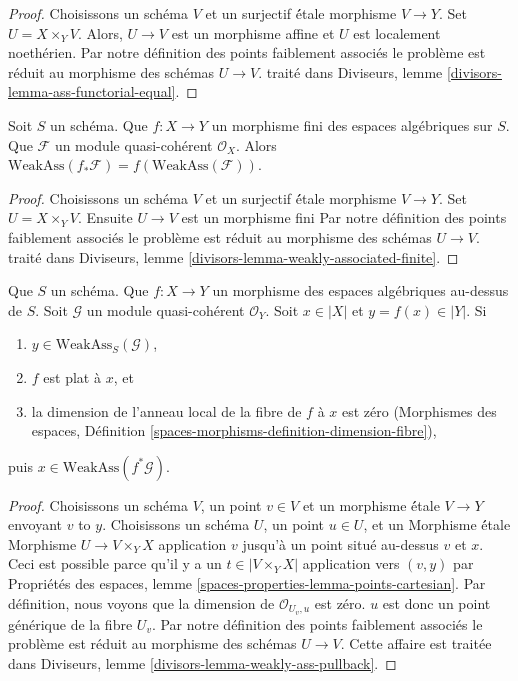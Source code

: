 \begin{proof}
Choisissons un schéma $V$ et un surjectif \'étale morphisme $V \to Y$.
Set $U = X \times_Y V$. Alors, $U \to V$ est un morphisme affine
et $U$ est localement noethérien.
Par notre définition des points faiblement associés
le problème est réduit au morphisme des schémas $U \to V$.
traité dans Diviseurs, lemme \ref{divisors-lemma-ass-functorial-equal}.
\end{proof}

\begin{lemma}
\label{lemma-weakly-associated-finite}
Soit $S$ un schéma.
Que $f : X \to Y$ un morphisme fini des espaces algébriques sur $S$.
Que $\mathcal{F}$ un module quasi-cohérent $\mathcal{O}_X$.
Alors $\text{WeakAss}(f_*\mathcal{F}) = f(\text{WeakAss}(\mathcal{F}))$.
\end{lemma}

\begin{proof}
Choisissons un schéma $V$ et un surjectif \'étale morphisme $V \to Y$.
Set $U = X \times_Y V$. Ensuite $U \to V$ est un morphisme fini
Par notre définition des points faiblement associés
le problème est réduit au morphisme des schémas $U \to V$.
traité dans Diviseurs, lemme \ref{divisors-lemma-weakly-associated-finite}.
\end{proof}

\begin{lemma}
\label{lemma-weakly-ass-pullback}
Que $S$ un schéma. Que $f : X \to Y$ un morphisme des espaces algébriques
au-dessus de $S$. Soit $\mathcal{G}$ un module quasi-cohérent $\mathcal{O}_Y$.
Soit $x \in |X|$ et $y = f(x) \in |Y|$. Si
\begin{enumerate}
\item $y \in \text{WeakAss}_S(\mathcal{G})$,
\item $f$ est plat à $x$, et
\item la dimension de l'anneau local de la fibre de $f$ à $x$
est zéro (Morphismes des espaces, Définition
\ref{spaces-morphisms-definition-dimension-fibre}),
\end{enumerate}
puis $x \in \text{WeakAss}(f^*\mathcal{G})$.
\end{lemma}

\begin{proof}
Choisissons un schéma $V$, un point $v \in V$ et un morphisme \'étale $V \to Y$
envoyant $v$ to $y$. Choisissons un schéma $U$, un point $u \in U$, et un
Morphisme \'étale Morphisme $U \to V \times_Y X$ application $v$ jusqu'à un point situé au-dessus
$v$ et $x$. Ceci est possible parce qu'il y a un $t \in |V \times_Y X|$
application vers $(v, y)$ par Propriétés des espaces, lemme
\ref{spaces-properties-lemma-points-cartesian}.
Par définition, nous voyons que la dimension de $\mathcal{O}_{U_v, u}$ est zéro.
$u$ est donc un point générique de la fibre $U_v$.
Par notre définition des points faiblement associés
le problème est réduit au morphisme des schémas $U \to V$.
Cette affaire est traitée dans
Diviseurs, lemme \ref{divisors-lemma-weakly-ass-pullback}.
\end{proof}

